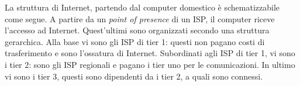 \documentclass{subfiles}
\begin{document}
La struttura di Internet, partendo dal computer domestico è schematizzabile come segue.
A partire da un \emph{point of presence} di un ISP, il computer riceve l'accesso ad Internet.
Quest'ultimi sono organizzati secondo una struttura gerarchica.
Alla base vi sono gli ISP di tier 1: questi non pagano costi di trasferimento e sono l'ossatura di Internet.
Subordinati agli ISP di tier 1, vi sono i tier 2: sono gli ISP regionali e pagano i tier uno per le comunicazioni.
In ultimo vi sono i tier 3, questi sono dipendenti da i tier 2, a quali sono connessi.
\end{document}
